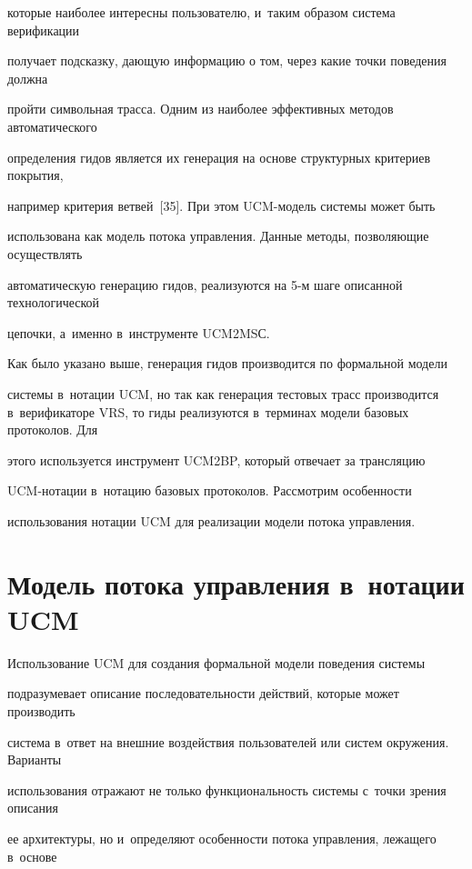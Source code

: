 которые наиболее интересны пользователю, и~таким образом система верификации


получает подсказку, дающую информацию о том, через какие точки поведения должна


пройти символьная трасса. Одним из наиболее эффективных методов автоматического


определения гидов является их генерация на основе структурных критериев покрытия,


например критерия ветвей~[35]. При этом UCM-мо\-дель системы может быть


использована как модель потока управления. Данные методы, позволяющие осуществлять


автоматическую генерацию гидов, реализуются на 5-м шаге описанной технологической


цепочки, а~именно в~инструменте UCM2MSС.





   Как было указано выше, генерация гидов производится по формальной модели


системы в~нотации UCM, но так как генерация тестовых трасс производится в~верификаторе VRS, то гиды реализуются в~терминах модели базовых протоколов. Для


этого используется инструмент UCM2BP, который отвечает за трансляцию


   UCM-но\-та\-ции в~нотацию базовых протоколов. Рассмотрим особенности


использования нотации UCM для реализации модели потока управления.





\section{Модель потока управления в~нотации UCM}





   Использование UCM для создания формальной модели поведения системы


подразумевает описание последовательности действий, которые может производить


система в~ответ на внешние воздействия пользователей или систем окружения. Варианты


использования отражают не только функциональность системы с~точки зрения описания


ее архитектуры, но и~определяют особенности потока управления, лежащего в~основе


